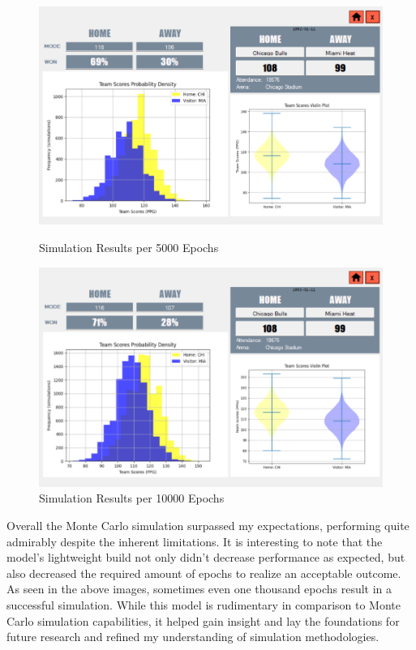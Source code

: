 \documentclass{thesis-ekf}
\theoremstyle{definition}
\theoremstyle{remark}
\begin{document}
\begin{figure}[H]
	\begin{minipage}{0.48\textwidth}
		\centering
		\includegraphics[width=\textwidth]{img/results/chi_mia_5000}
		\caption{Simulation Results per 5000 Epochs}
		\label{img-results-5000}
	\end{minipage}
	\hfill
	\begin{minipage}{0.48\textwidth}
		\centering
		\includegraphics[width=\textwidth]{img/results/chi_mia_10000}
		\caption{Simulation Results per 10000 Epochs}
		\label{img-results-10000}
	\end{minipage}
\end{figure}

Overall the Monte Carlo simulation surpassed my expectations, performing quite admirably despite the inherent limitations. It is interesting to note that the model's lightweight build not only didn't decrease performance as expected, but also decreased the required amount of epochs to realize an acceptable outcome. As seen in the above images, sometimes even one thousand epochs result in a successful simulation. While this model is rudimentary in comparison to Monte Carlo simulation capabilities, it helped gain insight and lay the foundations for future research and refined my understanding of simulation methodologies.
\end{document}
